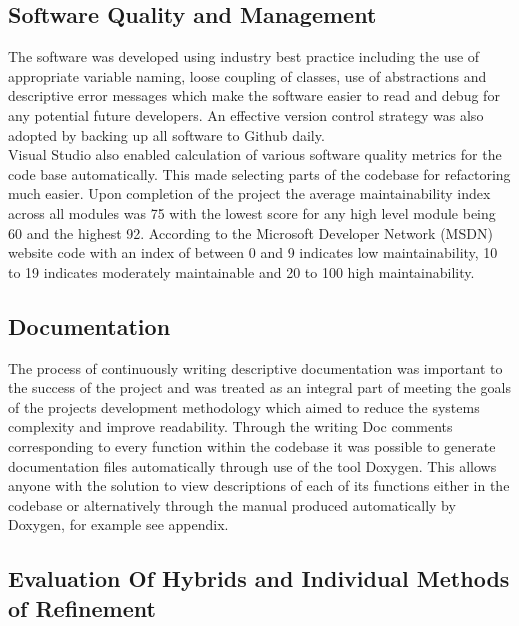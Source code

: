 \subsection{Software Quality and Management}
The software was developed using industry best practice including the use of appropriate variable naming, loose coupling of classes, use of abstractions and descriptive error messages which make the software easier to read and debug for any potential future developers. An effective version control strategy was also adopted by backing up all software to Github daily. \\

\noindent
Visual Studio also enabled calculation of various software quality metrics for the code base automatically. This made selecting parts of the codebase for refactoring much easier. Upon completion of the project the average maintainability index \cite{VisualStudioMaintainIndex} across all modules was 75 with the lowest score for any high level module being 60 and the highest 92. According to the Microsoft Developer Network (MSDN) website code with an index of between 0 and 9 indicates low maintainability, 10 to 19 indicates moderately maintainable and 20 to 100 high maintainability. \\ 

\subsection{Documentation}
The process of continuously writing descriptive documentation was important to the success of the project and was treated as an integral part of meeting the goals of the projects development methodology which aimed to reduce the systems complexity and improve readability. Through the writing Doc comments corresponding to every function within the codebase it was possible to generate documentation files automatically through use of the tool Doxygen. This allows anyone with the solution to view descriptions of each of its functions either in the codebase or alternatively through the manual produced automatically by Doxygen, for example see appendix. \\ 

 

\subsection{Evaluation Of Hybrids and Individual Methods of Refinement}

